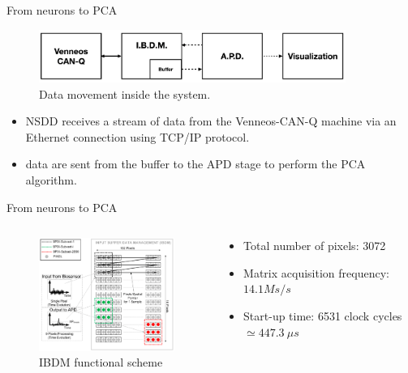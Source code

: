 \documentclass{beamer}
\begin{document}
\begin{frame}{From neurons to PCA}
\begin{figure}
    \centering     
    \vspace{-1.6cm}
    \includegraphics[width=10cm]{IBDM2.png}
    \caption{Data movement inside the system.}
\end{figure}
\begin{itemize}
    \item NSDD receives a stream of data from the Venneos-CAN-Q machine via an Ethernet connection using TCP/IP protocol.
    \item data are sent from the buffer to the APD stage to perform the PCA algorithm.
\end{itemize}
\end{frame}

\begin{frame}{From neurons to PCA}

    \begin{columns}
        \begin{column}{0.5\textwidth}
            \begin{figure}
                \vspace{-0.2cm}
                \includegraphics[width=6cm]{pca.png}
                \caption{IBDM functional scheme}
            \end{figure}
        \end{column}
        \hspace{0.6cm}
        \begin{column}{0.5\textwidth}
            \begin{itemize}
            	\item Total number of pixels: 3072
                \item Matrix acquisition frequency: $14.1 Ms/s$
                \item Start-up time: 6531 clock cycles $\simeq 447.3 \ \mu s$
            \end{itemize}
        \end{column}
    \end{columns}
\end{frame}
\end{document}
